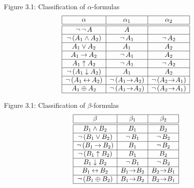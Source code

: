 \documentclass[style=simple,size=12pt]{powerdot}
\begin{document}


\begin{wideslide}[bm=,toc=]{Figure 3.1: Classification of $\alpha$-formulas}
\begin{displaymath}
\begin{array}{|c|c|c|}
\hline
\alpha & \alpha_{1} & \alpha_{2} \\ \hline \hline
\ngg \ngg A &  A & \\ \hline
\ngg\,(A_{1} \wedge A_{2}) & \ngg A_{1} & \ngg A_{2} \\ \hline
A_{1} \vee A_{2} & A_{1} & A_{2} \\ \hline
A_{1} \imp A_{2} & \ngg A_{1} & A_{2} \\ \hline
A_{1} \uparrow A_{2} & \ngg A_{1} & \ngg A_{2} \\ \hline
\ngg\,(A_{1} \downarrow A_{2}) & A_{1} & A_{2} \\ \hline
\ngg\,(A_{1} \eqv A_{2})& \ngg\,(A_{1} \!\imp\! A_{2}) &
\ngg\,(A_{2} \!\imp\! A_{1}) \\ \hline
A_{1} \neqv A_{2}& \ngg\,(A_{1} \!\imp\! A_{2}) &
\ngg\,(A_{2} \!\imp\! A_{1}) \\ \hline
\end{array}
\end{displaymath}
\end{wideslide}

\begin{wideslide}[bm=,toc=]{Figure 3.1: Classification of $\beta$-formulas}
\begin{displaymath}
\begin{array}{|c|c|c|}
\hline
\beta & \beta_{1} & \beta_{2} \\ \hline \hline
B_{1} \wedge B_{2} & B_{1} & B_{2} \\ \hline
\ngg\,(B_{1} \vee B_{2}) & \ngg B_{1} & \ngg B_{2} \\ \hline
\ngg\,(B_{1} \imp B_{2}) & B_{1} & \ngg B_{2} \\ \hline
\ngg\,(B_{1} \uparrow B_{2}) & B_{1} & B_{2} \\ \hline
B_{1} \downarrow B_{2} & \ngg B_{1} & \ngg B_{2} \\ \hline
B_{1} \eqv B_{2}& B_{1} \!\imp\! B_{2} &
B_{2} \!\imp\! B_{1}  \\ \hline
\ngg\,(B_{1} \neqv B_{2})& B_{1} \!\imp\! B_{2} &
B_{2} \!\imp\! B_{1}  \\ \hline
\end{array}
\end{displaymath}
\end{wideslide}
\end{document}
